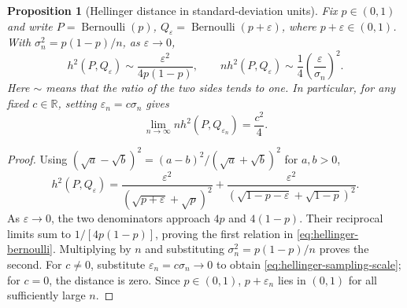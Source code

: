 \documentclass[11pt,twoside]{article}
\newcommand{\R}{\mathbb R}
\newtheorem{proposition}[theorem]{Proposition}
\theoremstyle{definition}
\theoremstyle{remark}
\begin{document}
\begin{proposition}[Hellinger distance in standard-deviation units]
\label{prop:hellinger-bernoulli}
Fix $p\in(0,1)$ and write $P=\operatorname{Bernoulli}(p)$,
$Q_\varepsilon=\operatorname{Bernoulli}(p+\varepsilon)$, where
$p+\varepsilon\in(0,1)$. With $\sigma_n^2=p(1-p)/n$, as
$\varepsilon\to0$,
\begin{equation}
 h^2(P,Q_\varepsilon)\sim\frac{\varepsilon^2}{4p(1-p)},\qquad
 n h^2(P,Q_\varepsilon)\sim\frac14\left(\frac{\varepsilon}{\sigma_n}\right)^2.
 \label{eq:hellinger-bernoulli}
\end{equation}
Here $\sim$ means that the ratio of the two sides tends to one.
In particular, for any fixed $c\in\R$, setting
$\varepsilon_n=c\sigma_n$ gives
\begin{equation}
 \lim_{n\to\infty}n h^2(P,Q_{\varepsilon_n})=\frac{c^2}{4}.
 \label{eq:hellinger-sampling-scale}
\end{equation}
\end{proposition}

\begin{proof}
Using $(\sqrt a-\sqrt b)^2=(a-b)^2/(\sqrt a+\sqrt b)^2$ for $a,b>0$,
\[
 h^2(P,Q_\varepsilon)
 =\frac{\varepsilon^2}{(\sqrt{p+\varepsilon}+\sqrt p)^2}
  +\frac{\varepsilon^2}{(\sqrt{1-p-\varepsilon}+\sqrt{1-p})^2}.
\]
As $\varepsilon\to0$, the two denominators approach $4p$ and $4(1-p)$.
Their reciprocal limits sum to $1/[4p(1-p)]$, proving the first relation
in \cref{eq:hellinger-bernoulli}. Multiplying by $n$ and substituting
$\sigma_n^2=p(1-p)/n$ proves the second. For $c\ne0$, substitute
$\varepsilon_n=c\sigma_n\to0$ to obtain
\cref{eq:hellinger-sampling-scale}; for $c=0$, the distance is zero.
Since $p\in(0,1)$, $p+\varepsilon_n$ lies in $(0,1)$ for all sufficiently
large $n$.
\end{proof}
\end{document}
